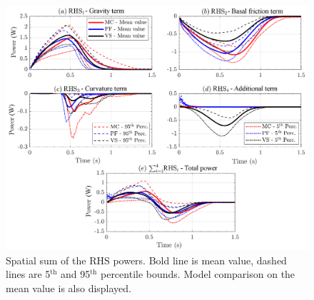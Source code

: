 \documentclass{article}
\begin{document}
\begin{figure}[H]
        \centering
        \includegraphics[width=1\textwidth]{InclinedPlane/AveragedMeasurments/PowersIncline.png}
        \caption{Spatial sum of the RHS powers. Bold line is mean value, dashed lines are 5$^{\mathrm{th}}$ and 95$^{\mathrm{th}}$ percentile bounds. Model comparison on the mean value is also displayed.}
        \label{fig:Ramp-Power-spatial}
\end{figure}
\end{document}
